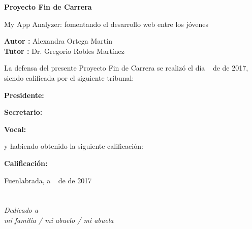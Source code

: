 \documentclass[a4paper, 12pt]{book}
\begin{document}
\vspace{-4cm}
\begin{center}
\LARGE
\textbf{Proyecto Fin de Carrera}

\vspace{1cm}
\large
My App Analyzer: fomentando el desarrollo web entre los jóvenes

\vspace{1cm}
\large
\textbf{Autor :} Alexandra Ortega Martín \\
\textbf{Tutor :} Dr. Gregorio Robles Martínez

\end{center}

\vspace{1cm}
La defensa del presente Proyecto Fin de Carrera se realizó el día \qquad$\;\,$ de \qquad\qquad\qquad\qquad \newline de 2017, siendo calificada por el siguiente tribunal:


\vspace{0.5cm}
\textbf{Presidente:}

\vspace{1.2cm}
\textbf{Secretario:}

\vspace{1.2cm}
\textbf{Vocal:}


\vspace{1.2cm}
y habiendo obtenido la siguiente calificación:

\vspace{1cm}
\textbf{Calificación:}


\vspace{1cm}
\begin{flushright}
Fuenlabrada, a \qquad$\;\,$ de \qquad\qquad\qquad\qquad de 2017
\end{flushright}


\chapter*{}
\begin{flushright}
\textit{Dedicado a \\
mi familia / mi abuelo / mi abuela}
\end{flushright}

\end{document}
